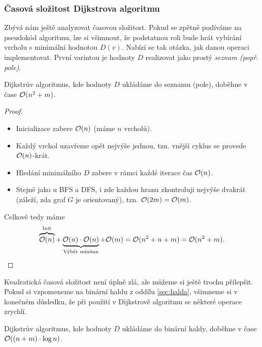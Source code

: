 \subsubsection{Časová složitost Dijkstrova algoritmu}

Zbývá nám ještě analyzovat časovou složitost. Pokud se zpětně podíváme na pseudokód algoritmu, lze si všimnout, že podstatnou roli bude hrát vybírání vrcholu s minimální hodnotou $D(v)$. Nabízí se tak otázka, jak danou operaci implementovat. První varintou je hodnoty $D$ realizovat jako prostý \emph{seznam (popř. pole)}.
\begin{theorem}
    Dijkstrův algoritmus, kde hodnoty $D$ ukládáme do seznamu (pole), doběhne v čase $\mathcal{O}(n^2+m)$.
\end{theorem}
\begin{proof}
    \begin{itemize}
        \item Inicializace zabere $\mathcal{O}(n)$ (máme $n$ vrcholů).
        \item Každý vrchol uzavřeme opět nejvýše jednou, tzn. vnější cyklus se provede $\mathcal{O}(n)$-krát.
        \item Hledání minimálního $D$ zabere v rámci každé iterace čas $\mathcal{O}(n)$.
        \item Stejně jako u BFS a DFS, i zde každou hranu zkontroluji nejvýše dvakrát (záleží, zda graf $G$ je orientovaný), tzn. $\mathcal{O}(2m)=\mathcal{O}(m)$.
    \end{itemize}
    Celkově tedy máme
    \[\overbrace{\mathcal{O}(n)}^{\text{Init}}+\underbrace{\mathcal{O}(n)\cdot\mathcal{O}(n)}_{\text{Výběr minima}}+\mathcal{O}(m)=\mathcal{O}(n^2+n+m)=\mathcal{O}(n^2+m).\]
\end{proof}
Kvadratická časová složitost není úplně zlá, ale můžeme si ještě trochu přilepšit. Pokud si vzpomeneme na binární haldu z oddílu \ref{sec:halda}, všimneme si v konečném důsledku, že při použití v Dijkstrově algoritmu se některé operace zrychlí.
\begin{theorem}
    Dijkstrův algoritmus, kde hodnoty $D$ ukládáme do binární haldy, doběhne v čase $\mathcal{O}((n+m)\cdot\log{n})$.
\end{theorem}
